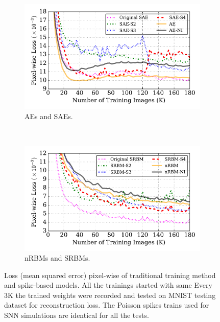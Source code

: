 \begin{figure}
	\centering
	\begin{subfigure}[t]{0.8\textwidth}
		\includegraphics[width=\textwidth]{pics_sdlm/53_MNIST_SRBM_all/compare_recon.pdf}
		\caption{AEs and SAEs.}
	\end{subfigure}\\
	\begin{subfigure}[t]{0.8\textwidth}
		\includegraphics[width=\textwidth]{pics_sdlm/53_MNIST_SRBM_all/compare_recon_rbm.pdf}
		\caption{nRBMs and SRBMs.}
	\end{subfigure}
	\caption{Loss (mean squared error) pixel-wise of \protect{} traditional training method and spike-based models. All the trainings started with same \protect{} \protect{} Every 3K \protect{} \protect{} the trained weights were recorded and tested on \protect{} MNIST testing dataset for reconstruction loss. The Poisson spikes trains used for SNN simulations are identical for all the tests.}
	\label{fig:sdlm_loss}
\end{figure}

